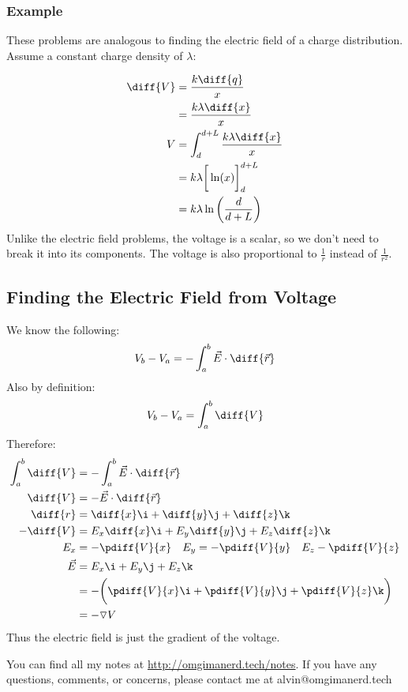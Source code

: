\documentclass{math}
\begin{document}
\subsubsection*{Example}
These problems are analogous to finding the electric field of a charge
distribution. Assume a constant charge density of \( \lambda \):
\begin{center}
\end{center}
\begin{align*}
  \diff{V} &= \frac{k\diff{q}}{x} \\
  &= \frac{k\lambda\diff{x}}{x} \\
  V &= \int_{d}^{d+L}\frac{k\lambda\diff{x}}{x} \\
  &= k\lambda\bigg[\ln(x)\bigg]_{d}^{d+L} \\
  &= k\lambda\ln\bigg(\frac{d}{d+L}\bigg)
\end{align*}
Unlike the electric field problems, the voltage is a scalar, so we don't need
to break it into its components. The voltage is also proportional to
\( \frac{1}{r} \) instead of \( \frac{1}{r^2} \).

\subsection*{Finding the Electric Field from Voltage}
We know the following:
\[ V_b-V_a = -\int_{a}^{b}\vec{E}\cdot\diff{\vec{r}} \]
Also by definition:
\[ V_b-V_a = \int_{a}^{b}\diff{V} \]
Therefore:
\begin{align*}
  \int_{a}^{b}\diff{V} &= -\int_{a}^{b}\vec{E}\cdot\diff{\vec{r}} \\
  \diff{V} &= -\vec{E}\cdot\diff{\vec{r}} \\
  \diff{r} &= \diff{x}\i+\diff{y}\j+\diff{z}\k \\
  -\diff{V} &= E_x\diff{x}\i+E_y\diff{y}\j+E_z\diff{z}\k \\
  E_x &= -\pdiff{V}{x} \quad E_y = -\pdiff{V}{y} \quad E_z -\pdiff{V}{z} \\
  \vec{E} &= E_x\i+E_y\j+E_z\k \\
  &= -\bigg(\pdiff{V}{x}\i+\pdiff{V}{y}\j+\pdiff{V}{z}\k\bigg) \\
  &= -\triangledown V
\end{align*}
Thus the electric field is just the gradient of the voltage.

\begin{center}
  You can find all my notes at \url{http://omgimanerd.tech/notes}. If you have
  any questions, comments, or concerns, please contact me at
  alvin@omgimanerd.tech
\end{center}
\end{document}
